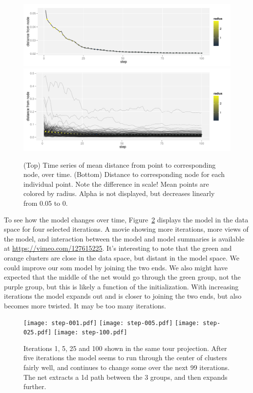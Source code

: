 \documentclass[preprint]{imsart}
\begin{document}
\begin{figure}[htbp]
  \centering
    \includegraphics[width=5in]{som-dist-mean}
    \includegraphics[width=5in]{som-dist}
  \caption{(Top) Time series of mean distance from point to corresponding node, over time.  (Bottom) Distance to corresponding node for each individual point.  Note the difference in scale!  Mean points are colored by radius.  Alpha is not displayed, but decreases linearly from 0.05 to 0.}
  \label{fig:som-dist}
\end{figure}

To see how the model changes over time, Figure~\ref{fig:iteration} displays the model in the data space for four selected iterations.  A movie showing more iterations, more views of the model, and interaction between the model and model summaries is available at \url{https://vimeo.com/127615225}.  It's interesting to note that the green and orange clusters are close in the data space, but distant in the model space.  We could improve our {\sc som} model by joining the two ends.  We also might have expected that the middle of the net would go through the green group, not the purple group, but this is likely a function of the initialization. With increasing iterations the model expands out and is closer to joining the two ends, but also becomes more twisted. It may be too many iterations.

\begin{figure}[htb]
  \centering
    \texttt{[image: step-001.pdf]}
    \texttt{[image: step-005.pdf]}
    \texttt{[image: step-025.pdf]}
    \texttt{[image: step-100.pdf]}
  \caption{Iterations 1, 5, 25 and 100 shown in the same tour projection.  After five iterations the model seems to run through the center of clusters fairly well, and continues to change some over the next 99 iterations.  The net  extracts a 1d path between the 3 groups, and then expands further. }
  \label{fig:iteration}
\end{figure}
\end{document}

